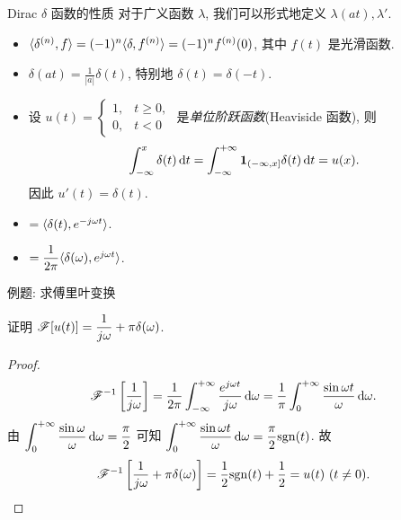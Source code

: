 \begin{frame}{Dirac $\delta$ 函数的性质}
对于广义函数 $\lambda$, 我们可以形式地定义 $\lambda(at),\lambda'$.
\onslide<+->
\begin{itemize}
\item $\langle{\delta^{(n)},f}\rangle=(-1)^n\langle{\delta,f^{(n)}}\rangle=(-1)^nf^{(n)}(0)$, 其中 $f(t)$ 是光滑函数.
\item $\delta(at)=\frac1{|a|}\delta(t)$, 特别地 $\delta(t)=\delta(-t)$.
\item 设 $u(t)=\begin{cases}1,&t\ge0,\\0,&t<0\end{cases}$ 是\emph{单位阶跃函数}(Heaviside 函数), 则
\[\int_{-\infty}^x\delta(t)\,\mathrm{d} t=\int_{-\infty}^{+\infty}\textbf{1}_{(-\infty,x]}\delta(t)\,\mathrm{d} t=u(x).\]
因此 $u'(t)=\delta(t)$.
\item \abox{$\msf[\delta(t)]$}$=\langle{\delta(t),e^{-j\omega t}}\rangle$.
\item{}$=\dfrac1{2\pi}\langle{\delta(\omega),e^{j\omega t}}\rangle$.
\end{itemize}
\end{frame}


\begin{frame}{例题: 求傅里叶变换}
\begin{example}
证明 \alert{$\mathscr{F}[u(t)]=\dfrac1{j\omega}+\pi\delta(\omega)$}.
\end{example}
\begin{proof}
\[\mathscr{F}^{-1}\left[\frac1{j\omega}\right]
=\frac1{2\pi}\int_{-\infty}^{+\infty}\frac{e^{j\omega t}}{j\omega} \,\mathrm{d}\omega
=\frac1\pi\int_0^{+\infty}\frac{\sin{\omega t}}{\omega} \,\mathrm{d}\omega.\]
\onslide<+->
由 $\displaystyle\int_0^{+\infty}\frac{\sin\omega}\omega \,\mathrm{d}\omega=\dfrac\pi2$
可知 $\displaystyle\int_0^{+\infty}\frac{\sin{\omega t}}\omega \,\mathrm{d}\omega=\frac\pi2{\mathrm{sgn}}(t)$.
\onslide<+->
故
\[\mathscr{F}^{-1} \left[\frac1{j\omega}+\pi\delta(\omega)\right]
=\frac12{\mathrm{sgn}}(t)+\frac12=u(t)\ (t\neq 0).\qedhere\]
\end{proof}
\end{frame}

